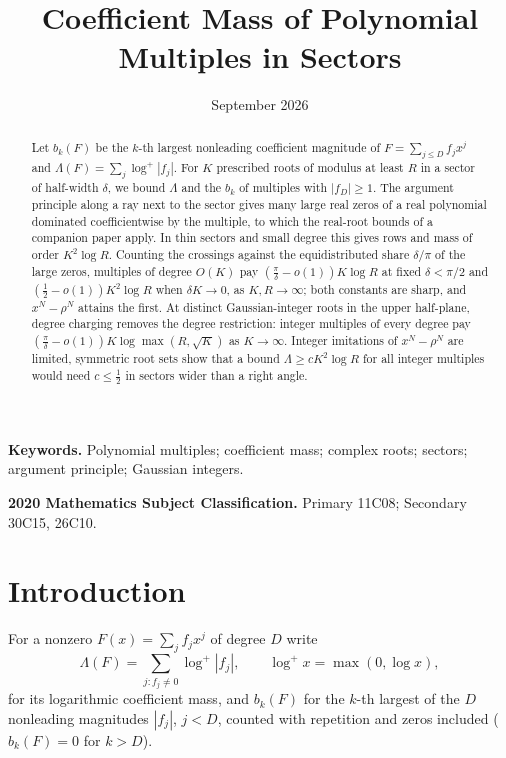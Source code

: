 \documentclass[11pt]{article}
\title{Coefficient Mass of Polynomial Multiples in Sectors}
\author{\shortstack{Bangyen Pham\\
\small Independent Researcher\\
\small\href{mailto:bangyenp@gmail.com}{\texttt{bangyenp@gmail.com}}\\
\small\href{https://orcid.org/0009-0006-9928-2088}{ORCID: 0009-0006-9928-2088}}}
\date{September 2026}
\begin{document}
\maketitle

\begin{abstract}
Let $b_k(F)$ be the $k$-th largest nonleading coefficient magnitude of
$F=\sum_{j\le D}f_jx^j$ and $\Lambda(F)=\sum_j\log^+|f_j|$.  For $K$
prescribed roots of modulus at least $R$ in a sector of half-width $\delta$,
we bound $\Lambda$ and the $b_k$ of multiples with $|f_D|\ge1$.  The
argument principle along a ray next to the sector gives many large real
zeros of a real polynomial dominated coefficientwise by the multiple, to
which the real-root bounds of a companion paper apply.  In thin sectors and
small degree this gives rows and mass of order $K^2\log R$.  Counting the
crossings against the equidistributed share $\delta/\pi$ of the large
zeros, multiples of degree $O(K)$ pay $(\frac\pi\delta-o(1))K\log R$ at
fixed $\delta<\pi/2$ and $(\frac12-o(1))K^2\log R$ when $\delta K\to0$, as
$K,R\to\infty$; both constants are sharp, and $x^N-\rho^N$ attains the
first.  At distinct Gaussian-integer roots in the upper half-plane, degree
charging removes the degree restriction: integer multiples of every degree
pay $(\frac\pi\delta-o(1))K\log\max(R,\sqrt K)$ as $K\to\infty$.  Integer imitations of
$x^N-\rho^N$ are limited, symmetric root sets show that a bound
$\Lambda\ge cK^2\log R$ for all integer multiples would need $c\le\frac12$
in sectors wider than a right angle.
\end{abstract}

\noindent\textbf{Keywords.} Polynomial multiples; coefficient mass; complex
roots; sectors; argument principle; Gaussian integers.

\noindent\textbf{2020 Mathematics Subject Classification.} Primary 11C08; Secondary 30C15, 26C10.

\section{Introduction}

For a nonzero $F(x)=\sum_jf_jx^j$ of degree $D$ write
\[
  \Lambda(F)=\sum_{j:f_j\ne0}\log^+|f_j|,\qquad \log^+x=\max(0,\log x),
\]
for its logarithmic coefficient mass, and $b_k(F)$ for the $k$-th largest of
the $D$ nonleading magnitudes $|f_j|$, $j<D$, counted with repetition and
zeros included ($b_k(F)=0$ for $k>D$).
\end{document}
